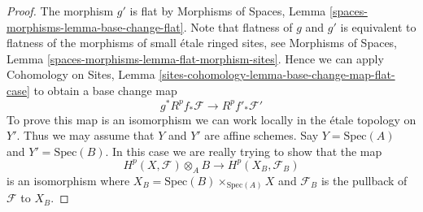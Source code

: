 \begin{proof}
The morphism $g'$ is flat by
Morphisms of Spaces, Lemma \ref{spaces-morphisms-lemma-base-change-flat}.
Note that flatness of $g$ and $g'$ is equivalent to flatness
of the morphisms of small \'etale ringed sites, see
Morphisms of Spaces, Lemma \ref{spaces-morphisms-lemma-flat-morphism-sites}.
Hence we can apply
Cohomology on Sites, Lemma
\ref{sites-cohomology-lemma-base-change-map-flat-case}
to obtain a base change map
$$
g^*R^pf_*\mathcal{F} \longrightarrow R^pf'_*\mathcal{F}'
$$
To prove this map is an isomorphism we can work locally in the \'etale
topology on $Y'$. Thus we may assume that $Y$ and $Y'$ are affine
schemes. Say $Y = \text{Spec}(A)$ and $Y' = \text{Spec}(B)$.
In this case we are really trying to show that the map
$$
H^p(X, \mathcal{F}) \otimes_A B \longrightarrow H^p(X_B, \mathcal{F}_B)
$$
is an isomorphism where $X_B = \text{Spec}(B) \times_{\text{Spec}(A)} X$ and
$\mathcal{F}_B$ is the pullback of $\mathcal{F}$ to $X_B$.


\end{proof}
